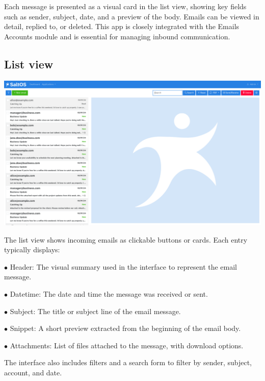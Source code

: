 \documentclass[a4paper]{article}
\begin{document}
Each message is presented as a visual card in the list view, showing key fields such as sender, subject,
date, and a preview of the body. Emails can be viewed in detail, replied to, or deleted. This app is
closely integrated with the Emails Accounts module and is essential for managing inbound communication.

\hypertarget{toc92}{}
\subsection{List view}

\begin{center}\includegraphics[width=1\textwidth]{../ujest/snaps/test-screenshots-js-screenshots-emails-emails-list-en-us-1-snap.png}\end{center}

The list view shows incoming emails as clickable buttons or cards.
Each entry typically displays:

\begin{compactitem}
\item[\color{myblue}$\bullet$] Header: The visual summary used in the interface to represent the email message.
\item[\color{myblue}$\bullet$] Datetime: The date and time the message was received or sent.
\item[\color{myblue}$\bullet$] Subject: The title or subject line of the email message.
\item[\color{myblue}$\bullet$] Snippet: A short preview extracted from the beginning of the email body.
\item[\color{myblue}$\bullet$] Attachments: List of files attached to the message, with download options.
\end{compactitem}

The interface also includes filters and a search form to filter by sender, subject, account, and date.
\end{document}
